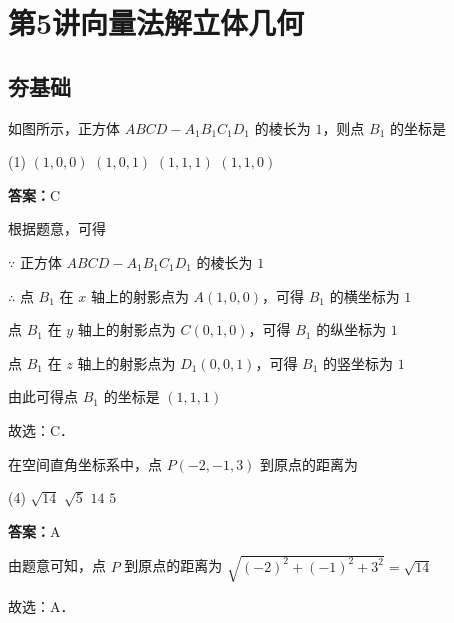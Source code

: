 \section{第5讲\quad 向量法解立体几何}
\subsection{夯基础}

\begin{example}[\bkstar{1}{5}]
如图所示，正方体 $ABCD-A_1B_1C_1D_1$ 的棱长为 $1$，则点 $B_1$ 的坐标是
\begin{tasks}(1)
    \task $(1,0,0)$
    \task $(1,0,1)$
    \task $(1,1,1)$
    \task $(1,1,0)$
\end{tasks}
\end{example}
\begin{solution}
\textbf{答案：}C

根据题意，可得

$\because$ 正方体 $ABCD-A_1B_1C_1D_1$ 的棱长为 $1$

$\therefore$ 点 $B_1$ 在 $x$ 轴上的射影点为 $A(1,0,0)$，可得 $B_1$ 的横坐标为 $1$

点 $B_1$ 在 $y$ 轴上的射影点为 $C(0,1,0)$，可得 $B_1$ 的纵坐标为 $1$

点 $B_1$ 在 $z$ 轴上的射影点为 $D_1(0,0,1)$，可得 $B_1$ 的竖坐标为 $1$

由此可得点 $B_1$ 的坐标是 $(1,1,1)$

故选：C．
\end{solution}

\vspace{2em}

\begin{example}[\bkstar{1}{5}]
在空间直角坐标系中，点 $P(-2,-1,3)$ 到原点的距离为
\begin{tasks}(4)
    \task $\sqrt{14}$
    \task $\sqrt{5}$
    \task $14$
    \task $5$
\end{tasks}
\end{example}
\begin{solution}
\textbf{答案：}A

由题意可知，点 $P$ 到原点的距离为 $\sqrt{(-2)^2+(-1)^2+3^2}=\sqrt{14}$

故选：A．
\end{solution}

\vspace{2em}

